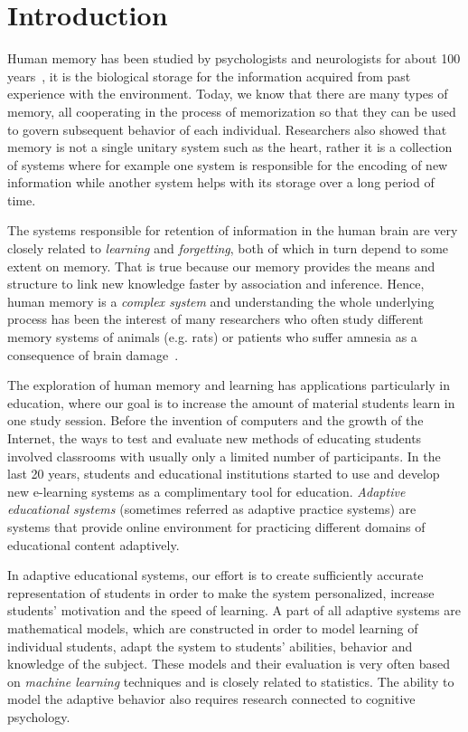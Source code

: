 \chapter{Introduction}

Human memory has been studied by psychologists and neurologists for about 100 years~\cite{baddeley1997human}, it is the biological storage for the information acquired from past experience with the environment. Today, we know that there are many types of memory, all cooperating in the process of memorization so that they can be used to govern subsequent behavior of each individual. Researchers also showed that memory is not a single unitary system such as the heart, rather it is a collection of systems where for example one system is responsible for the encoding of new information while another system helps with its storage over a long period of time.

The systems responsible for retention of information in the human brain are very closely related to \textit{learning} and \textit{forgetting}, both of which in turn depend to some extent on memory. That is true because our memory provides the means and structure to link new knowledge faster by association and inference. Hence, human memory is a \textit{complex system} and understanding the whole underlying process has been the interest of many researchers who often study different memory systems of animals (e.g. rats) or patients who suffer amnesia as a consequence of brain damage~\cite{mcclelland1995there}.

The exploration of human memory and learning has applications particularly in education, where our goal is to increase the amount of material students learn in one study session. Before the invention of computers and the growth of the Internet, the ways to test and evaluate new methods of educating students involved classrooms with usually only a limited number of participants. In the last 20 years, students and educational institutions started to use and develop new e-learning systems as a complimentary tool for education. \textit{Adaptive educational systems} (sometimes referred as adaptive practice systems) are systems that provide online environment for practicing different domains of educational content adaptively.

In adaptive educational systems, our effort is to create sufficiently accurate representation of students in order to make the system personalized, increase students' motivation and the speed of learning. A part of all adaptive systems are mathematical models, which are constructed in order to model learning of individual students, adapt the system to students' abilities, behavior and knowledge of the subject. These models and their evaluation is very often based on \textit{machine learning} techniques and is closely related to statistics. The ability to model the adaptive behavior also requires research connected to cognitive psychology.

